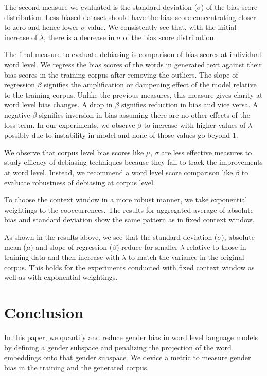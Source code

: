 \documentclass[11pt,a4paper]{article}
\begin{document}
The second measure we evaluated is the standard deviation ($\sigma$) of the bias score distribution. Less biased dataset should have the bias score concentrating closer to zero and hence lower $\sigma$ value. We consistently see that, with the initial increase of $\lambda$, there is a decrease in $\sigma$ of the bias score distribution.

The final measure to evaluate debiasing is comparison of bias scores at individual word level. We regress the bias scores of the words in generated text against  their bias scores in the training corpus after removing the outliers. The slope of regression  $\beta$ signifies the amplification or dampening effect of the model relative to the training corpus. Unlike the previous measures, this measure gives clarity at word level bias changes. A drop in $\beta$ signifies reduction in bias and vice versa. A negative $\beta$ signifies inversion in bias assuming there are no other effects of the loss term. In our experiments, we observe $\beta$ to increase with higher values of $\lambda$ possibly due to instability in model and none of those values go beyond 1. 

We observe that corpus level bias scores like $\mu$, $\sigma$ are less effective measures to study efficacy of debiasing techniques because they fail to track the improvements at word level. Instead, we recommend a word level score comparison like $\beta$ to evaluate robustness of debiasing at corpus level.

To choose the context window in a more robust manner,  we take exponential weightings to the cooccurrences. The results for aggregated average of absolute bias and standard deviation show the same pattern as in fixed context window. 

As shown in the results above, we see that the standard deviation ($\sigma$), absolute mean ($\mu$) and slope of regression ($\beta$) reduce for smaller $\lambda$ relative to those in training data and then increase with $\lambda$ to match the variance in the original corpus. This holds for the experiments conducted with  fixed context window as well as with exponential weightings.

\section{Conclusion}
In this paper, we quantify and reduce gender bias in word level language models by defining a gender subspace and penalizing the projection of the word embeddings onto that gender subspace. We device a metric to measure gender bias in the training and the generated corpus.%
\end{document}
